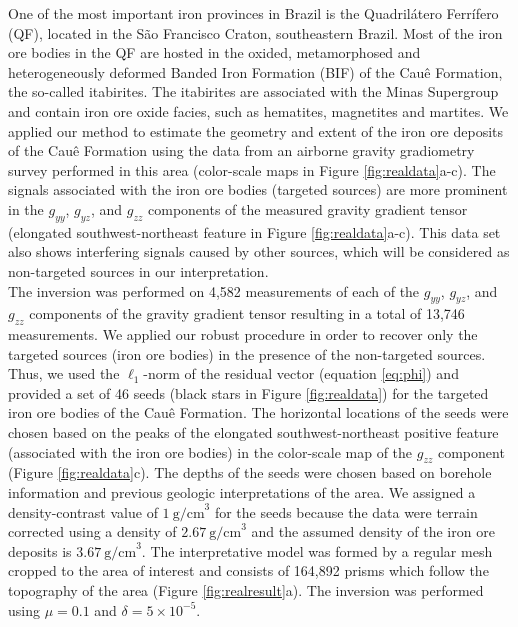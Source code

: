 One of the most important iron provinces in Brazil is the Quadril\'atero
Ferr\'ifero (QF), located in the S\~ao Francisco Craton, southeastern Brazil.
Most of the iron ore bodies in the QF are hosted in the oxided, metamorphosed
and heterogeneously deformed Banded Iron Formation (BIF) of the Cau\^e
Formation, the so-called itabirites.
The itabirites are associated with the Minas Supergroup and contain iron ore
oxide facies, such as hematites, magnetites and martites.
We applied our method to estimate the geometry and extent of the iron ore
deposits of the Cau\^e Formation using the data from an airborne gravity
gradiometry survey performed in this area (color-scale maps in Figure
\ref{fig:realdata}a-c).
The signals associated with the iron ore bodies (targeted sources)
are more prominent in the $g_{yy}$, $g_{yz}$, and $g_{zz}$ components of the
measured gravity gradient tensor (elongated southwest-northeast feature in
Figure \ref{fig:realdata}a-c).
This data set also shows interfering signals caused by
other sources, which will be considered as non-targeted sources in our
interpretation.
\\ \indent
The inversion was performed on 4,582 measurements of each of the $g_{yy}$,
$g_{yz}$, and $g_{zz}$ components of the gravity gradient tensor resulting in a
total of 13,746 measurements.
We applied our robust procedure in order to recover only the targeted sources
(iron ore bodies) in the presence of the non-targeted sources.
Thus, we used the $\ell_1$-norm of the residual vector (equation \ref{eq:phi})
and provided a set of 46 seeds (black stars in Figure
\ref{fig:realdata}) for
the targeted iron ore bodies of the Cau\^e Formation.
The horizontal locations of the seeds were chosen based on the peaks of the
elongated southwest-northeast positive feature (associated with the iron ore
bodies) in the color-scale map of the $g_{zz}$ component (Figure
\ref{fig:realdata}c).
The depths of the seeds were chosen based on borehole information and previous
geologic interpretations of the area.
We assigned a density-contrast value of $1\ \mathrm{g/cm}^3$ for the seeds
because the data were terrain corrected using a density of
$2.67\ \mathrm{g/cm}^3$ and the assumed density of the iron ore deposits is
$3.67\ \mathrm{g/cm}^3$.
The interpretative model was formed by a regular mesh cropped to the area of
interest and consists of 164,892 prisms which follow the topography of the area
(Figure \ref{fig:realresult}a).
The inversion was performed using $\mu=0.1$ and $\delta = 5 \times 10^{-5}$.
\\ \indent
